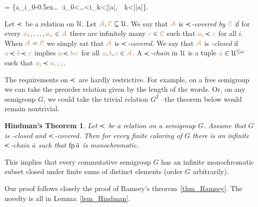 {=}
{\Big\{{\mr a_{i_0}}\kern-0.5ex\cdot\dots{}\ :\quad i_0<\dots<i_k<|{\mr\bar a}|,\ \ k<|{\mr\bar a}|\Big\}}. 

% 
% 
\bigskip
Let \emph{$\cpaw$\/} be a relation on $\EuScript U$.
Let ${\color{brown}\EuScript A},{\color{brown}\EuScript C}\subseteq\EuScript U$.
We say that ${\color{brown}\EuScript A}$ is \emph{$\cpaw$-covered by ${\color{brown}\EuScript C}$\/} 
if for every ${\color{brown} a_1},\dots,{\color{brown} a_n}\in{\color{brown}\EuScript A}$ there are infinitely many ${\color{brown} c}\in{\color{brown}\EuScript C}$ such that ${\mr a_i}\cpaw{\mr c}$ for all $i$.
When ${\color{brown}\EuScript A}={\color{brown}\EuScript C}$ we simply sat that ${\color{brown}\EuScript A}$ is \emph{$\cpaw$-covered.}
We say that ${\color{brown}\EuScript A}$ is \emph{\cpawdot-closed\/} 
if ${\mr a}\cpaw{\mr b}\cpaw{\mr c}$ implies ${\mr a}\cpaw{\mr b}{\cdot}{\mr c}$ 
for all ${\color{brown} a},{\color{brown} b},{\color{brown} c}\in{\color{brown}\EuScript A}$.
A \emph{$\cpaw$-chain\/} in $\EuScript U$ is a tuple ${\color{brown}\bar a}\in\EuScript U^{\le\omega}$ such that ${\mr a_i}\cpaw{\mr a_{i+1}}$.

The requirements on  $\cpaw$ are hardly restrictive.
For example, on a free semigroup we can take the preorder relation given by the length of the words.
%
Or, on any semigroup $G$, we could take the trivial relation $G^2$ --the theorem below would remain nontrivial.

\theoremstyle{mio}
\newtheorem{Hindman}[thm]{Hindman's Theorem}
\begin{Hindman}\label{thm_Hindman}
Let $\cpaw$ be a relation on a semigroup $G$.
%
Assume that $G$ is  \cpawdot-closed and $\cpaw$-covered.
%
Then for every finite coloring of $G$ 
there is an infinite $\cpaw$-chain $\bar a$ such that ${\rm fp}\,\bar a$ is monochromatic.
\end{Hindman}

This implies that every commutative semigroup $G$ has an infinite monochromatic subset closed under finite sums of distinct elements (order $G$ arbitrarily).

Our proof follows closely the proof of Ramsey's theorem~\ref{thm_Ramsey}.
%
The novelty is all in Lemma~\ref{lem_Hindman}.


